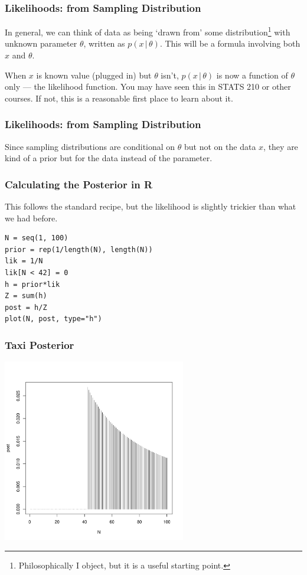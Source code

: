 \documentclass{beamer}
\newcommand{\given}{\,|\,}
\begin{document}
\begin{frame}
\frametitle{Likelihoods: from Sampling Distribution}
In general, we can think of data as being `drawn from'
some distribution\footnote{Philosophically I object, but it is a useful
starting point.}
with unknown parameter $\theta$, written as $p(x \given \theta)$.
This will be a formula involving both $x$ and $\theta$.
\pause

When $x$ is known value (plugged in) but $\theta$ isn't, $p(x \given \theta)$
is now a function of $\theta$ only --- the likelihood function.
You may have seen this in STATS 210 or other courses. If not, this is a
reasonable first place to learn about it.

\end{frame}


\begin{frame}
\frametitle{Likelihoods: from Sampling Distribution}
Since sampling distributions are conditional on $\theta$ but not on the
data $x$, they are kind of a prior but for the data instead of the parameter.

\end{frame}



\begin{frame}[fragile]
\frametitle{Calculating the Posterior in R}
This follows the standard recipe, but the likelihood is slightly trickier
than what we had before.
\begin{verbatim}
N = seq(1, 100)
prior = rep(1/length(N), length(N))
lik = 1/N
lik[N < 42] = 0
h = prior*lik
Z = sum(h)
post = h/Z
plot(N, post, type="h")
\end{verbatim}

\end{frame}

\begin{frame}
\frametitle{Taxi Posterior}

\centering
\includegraphics[width=0.6\textwidth]{images/taxi_posterior.pdf}

\end{frame}
\end{document}
